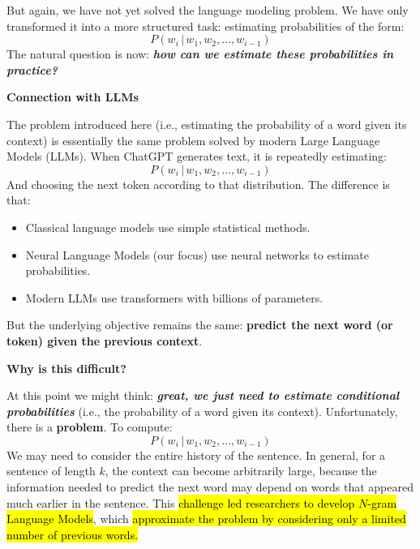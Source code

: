 \highspace
But again, we have not yet solved the language modeling problem. We have only transformed it into a more structured task: estimating probabilities of the form:
\begin{equation*}
    P\left(w_i \, | \, w_1, w_2, \dots, w_{i-1}\right)
\end{equation*}
The natural question is now: \emph{\textbf{how can we estimate these probabilities in practice?}}

\highspace
\begin{flushleft}
    \textcolor{Green3}{ \textbf{Connection with LLMs}}
\end{flushleft}
The problem introduced here (i.e., estimating the probability of a word given its context) is essentially the same problem solved by modern Large Language Models (LLMs). When ChatGPT generates text, it is repeatedly estimating:
\begin{equation*}
    P\left(w_i \, | \, w_1, w_2, \dots, w_{i-1}\right)
\end{equation*}
And choosing the next token according to that distribution. The difference is that:
\begin{itemize}
    \item Classical language models use simple statistical methods.
    \item Neural Language Models (our focus) use neural networks to estimate probabilities.
    \item Modern LLMs use transformers with billions of parameters.
\end{itemize}
But the underlying objective remains the same: \textbf{predict the next word (or token) given the previous context}.

\highspace
\begin{flushleft}
    \textcolor{Red2}{ \textbf{Why is this difficult?}}
\end{flushleft}
At this point we might think: \emph{\textbf{great, we just need to estimate conditional probabilities}} (i.e., the probability of a word given its context). Unfortunately, there is a \textbf{problem}. To compute:
\begin{equation*}
    P\left(w_i \, | \, w_1, w_2, \dots, w_{i-1}\right)
\end{equation*}
We may need to consider the entire history of the sentence. In general, for a sentence of length $k$, the context can become arbitrarily large, because the information needed to predict the next word may depend on words that appeared much earlier in the sentence. This \hl{challenge led researchers to develop $N$-gram Language Models}, which \hl{approximate the problem by considering only a limited number of previous words.}